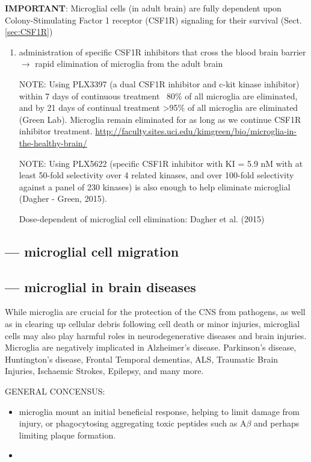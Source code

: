 {\bf IMPORTANT}: Microglial cells (in adult brain) are fully dependent upon 
Colony-Stimulating Factor 1 receptor (CSF1R) signaling for their survival
(Sect.\ref{sec:CSF1R})
\begin{enumerate}
  \item  administration of specific CSF1R inhibitors that cross the blood brain
  barrier $\rightarrow$  rapid elimination of microglia from the adult brain
  
NOTE: Using PLX3397 (a dual CSF1R inhibitor and c-kit kinase inhibitor) within 7
days of continuous treatment ~80\% of all microglia are eliminated, and by 21
days of continual treatment >95\% of all microglia are eliminated (Green Lab).
Microglia remain eliminated for as long as we continue CSF1R inhibitor treatment. 
\url{http://faculty.sites.uci.edu/kimgreen/bio/microglia-in-the-healthy-brain/}
 
NOTE: Using  PLX5622 (specific CSF1R inhibitor with KI = 5.9 nM with at least
50-fold selectivity over 4 related kinases, and over 100-fold selectivity
against a panel of 230 kinases) is also enough to help eliminate microglial
(Dagher - Green, 2015).

Dose-dependent of microglial cell elimination: Dagher et al. (2015)

 
\end{enumerate}


\subsection{--- microglial cell migration}



\subsection{--- microglial in brain diseases}

While microglia are crucial for the protection of the CNS from pathogens, as
well as in clearing up cellular debris following cell death or minor injuries,
microglial cells may also play harmful roles in neurodegenerative diseases and
brain injuries. Microglia are negatively implicated in Alzheimer's disease.
Parkinson's disease, Huntington's disease, Frontal Temporal dementias, ALS,
Traumatic Brain Injuries, Ischaemic Strokes, Epilepsy, and many more.

GENERAL CONCENSUS:
\begin{itemize}
  \item  microglia mount an initial beneficial response, helping to limit damage
  from injury, or  phagocytosing aggregating toxic peptides such as A$\beta$ 
  and perhaps limiting plaque formation.
  
  \item 
\end{itemize}




